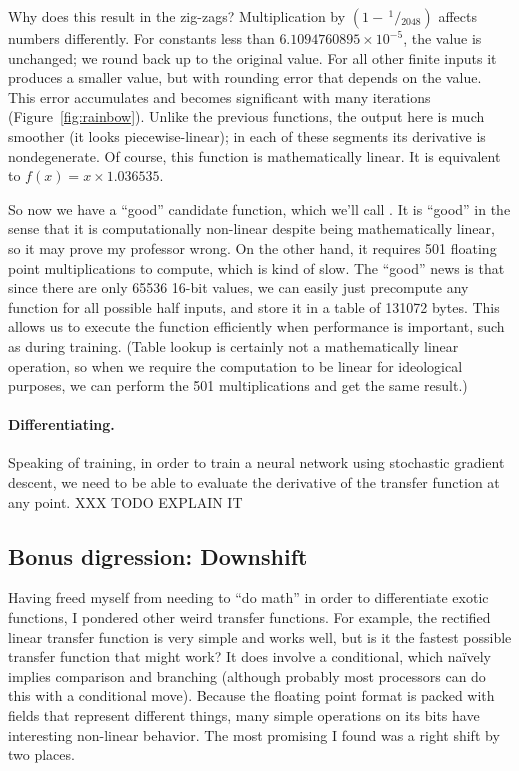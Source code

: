 \documentclass[twocolumn]{article}
\newcommand\sfrac[2]{\!{}\,^{#1}\!/{}\!_{#2}}
\begin{document}
Why does this result in the zig-zags? Multiplication by $(1 -
\sfrac{1}{2048})$ affects numbers differently. For constants less than
$6.1094760895 \times 10^{-5}$, the value is unchanged; we round back up to
the original value. For all other finite inputs it produces a smaller
value, but with rounding error that depends on the value. This error
accumulates and becomes significant with many iterations
(Figure~\ref{fig:rainbow}). Unlike the previous functions, the output
here is much smoother (it looks piecewise-linear); in each of these
segments its derivative is nondegenerate. Of course, this function is
mathematically linear. It is equivalent to $f(x) = x \times 1.036535$.

So now we have a ``good'' candidate function, which we'll call \gradone.
It is ``good'' in the sense that it is computationally non-linear
despite being mathematically linear, so it may prove my professor
wrong. On the other hand, it requires 501 floating point
multiplications to compute, which is kind of slow. The ``good'' news
is that since there are only 65536 16-bit values, we can easily just
precompute any function for all possible half inputs, and store it in
a table of 131072 bytes. This allows us to execute the function
efficiently when performance is important, such as during training.
(Table lookup is certainly not a mathematically linear operation, so
when we require the computation to be linear for ideological purposes,
we can perform the 501 multiplications and get the same result.)

\paragraph{Differentiating.}
Speaking of training, in order to train a neural network using
stochastic gradient descent, we need to be able to evaluate the
derivative of the transfer function at any point.
 XXX TODO EXPLAIN IT

\subsection{Bonus digression: Downshift}
Having freed myself from needing to ``do math'' in order to
differentiate exotic functions, I pondered other weird transfer
functions. For example, the rectified linear transfer function is very
simple and works well, but is it the fastest possible transfer
function that might work? It does involve a conditional, which na\"ively
implies comparison and branching (although probably most processors
can do this with a conditional move). Because the floating point
format is packed with fields that represent different things, many
simple operations on its bits have interesting non-linear behavior.
The most promising I found was a right shift by two places.
\end{document}
